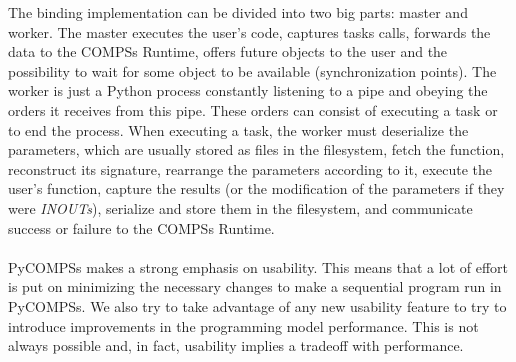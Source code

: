 The binding implementation can be divided into two big parts: master and worker. The master executes the user's code, captures tasks calls, forwards the data to the COMPSs Runtime, offers future objects to the user and the possibility to wait for some object to be available (synchronization points). The worker is just a Python process constantly listening to a pipe and obeying the orders it receives from this pipe. These orders can consist of executing a task or to end the process. When executing a task, the worker must deserialize the parameters, which are usually stored as files in the filesystem, fetch the function, reconstruct its signature, rearrange the parameters according to it, execute the user's function, capture the results (or the modification of the parameters if they were \textit{INOUTs}), serialize and store them in the filesystem, and communicate success or failure to the COMPSs Runtime.\\
\\
PyCOMPSs makes a strong emphasis on usability. This means that a lot of effort is put on minimizing the necessary changes to make a sequential program run in PyCOMPSs. We also try to take advantage of any new usability feature to try to introduce improvements in the programming model performance. This is not always possible and, in fact, usability implies a tradeoff with performance.

